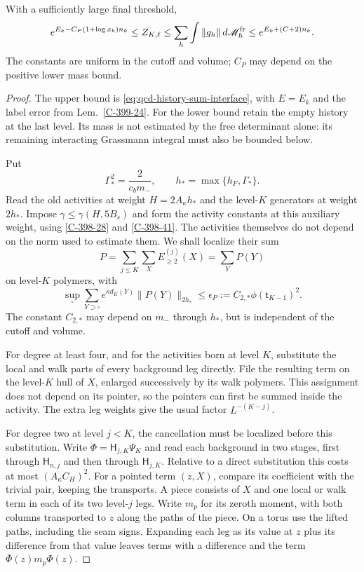 \documentclass[11pt,letterpaper,reqno]{amsart}
\makeatletter
\theoremstyle{definition}
\newcommand{\ms@majorstart}{%
  \pushQED{\qed}\renewcommand{\qedsymbol}{$\blacksquare\square$}}
\newenvironment{theorem}[1][]{\ms@majorstart\ms@theorem[#1]}
  {\popQED\endms@theorem}
\theoremstyle{remark}
\makeatother
\begin{document}
\begin{theorem}[One vacuum energy in both bounds]\label{C-399-4}
With a sufficiently large final threshold,
\[
 e^{E_k-C_P(1+\log x_k)n_k}\le Z_{K,\ell}
 \le\sum_h\int\|g_h\|\,d\mathscr M_h^{\rm fr}
 \le e^{E_k+(C+2)n_k}.
\]
The constants are uniform in the cutoff and volume; $C_P$
may depend on the positive lower mass bound.
\end{theorem}
\begin{proof}
The upper bound is \eqref{eq:qcd-history-sum-interface}, with
$E=E_k$ and the label error from Lem.~\ref{C-399-24}.
For the lower bound retain the empty history at the last
level. Its mass is not estimated by the free determinant
alone: its remaining interacting Grassmann integral must
also be bounded below.

Put
\[
 \Gamma_*^2=\frac2{c_bm_-},\qquad h_* =\max\{h_F,\Gamma_*\}.
\]
Read the old activities at weight $H=2A_\kappa h_*$ and
the level-$K$ generators at weight $2h_*$. Impose
$\gamma\le\gamma(H,5B_s)$ and form the activity constants
at this auxiliary weight, using \cref{C-398-28} and \cref{C-398-41}. The activities themselves do
not depend on the norm used to estimate them. We shall
localize their sum
\[
 P=\sum_{j\le K}\sum_XE^{(j)}_{\ge2}(X)
       =\sum_YP(Y)
\]
on level-$K$ polymers, with
\begin{equation}\label{eq:qcd-last-level-activity}
 \sup_\square\sum_{Y\supset\square}e^{\kappa d_K(Y)}
                   \|P(Y)\|_{2h_*}
 \le\epsilon_P:=C_{2,*}\phi(\mathsf t_{K-1})^2.
\end{equation}
The constant $C_{2,*}$ may depend on $m_-$ through $h_*$,
but is independent of the cutoff and volume.

For degree at least four, and for the activities born at
level $K$, substitute the local and walk parts of every
background leg directly. File the resulting term on the
level-$K$ hull of $X$, enlarged successively by its walk
polymers. This assignment does not depend on its pointer,
so the pointers can first be summed inside the activity.
The extra leg weights give the usual factor $L^{-(K-j)}$.

For degree two at level $j<K$, the cancellation must be
localized before this substitution. Write
$\Phi=\mathsf H_{j,K}\Psi_K$ and read each background in
two stages, first through $\mathsf H_{n,j}$ and then through
$\mathsf H_{j,K}$. Relative to a direct substitution this
costs at most $(A_\kappa C_H)^2$. For a pointed term
$(z,X)$, compare its coefficient with the trivial pair,
keeping the transports. A piece consists of $X$ and one
local or walk term in each of its two level-$j$ legs.
Write $m_p$ for its zeroth moment, with both columns
transported to $z$ along the paths of the piece. On a
torus use the lifted paths, including the seam signs.
Expanding each leg as its value at $z$ plus its difference
from that value leaves terms with a difference and the
term $\bar\Phi(z)m_p\Phi(z)$.


\end{proof}
\end{document}
